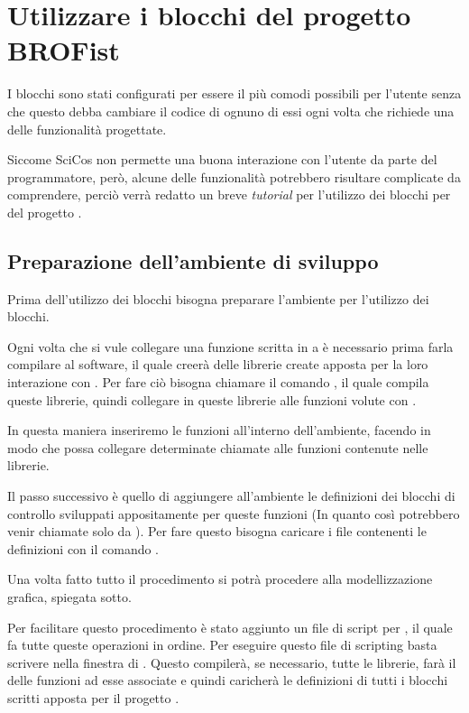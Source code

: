 \chapter{Utilizzare i blocchi del progetto BROFist}
I blocchi sono stati configurati per essere il più comodi possibili per
l'utente senza che questo debba cambiare il codice di ognuno di essi ogni
volta che richiede una delle funzionalità progettate.

Siccome SciCos non permette una buona interazione con l'utente da parte del
programmatore, però, alcune delle funzionalità potrebbero risultare
complicate da comprendere, perciò verrà redatto un breve \emph{tutorial}
per l'utilizzo dei blocchi per \SciCos{} del progetto \BROFist{}.

\section{Preparazione dell'ambiente di sviluppo}\label{sec:SciComp}
Prima dell'utilizzo dei blocchi bisogna preparare l'ambiente per l'utilizzo
dei blocchi.

Ogni volta che si vule collegare una funzione scritta in  a
\SciCosLab{} è necessario prima farla compilare al software, il quale
creerà delle librerie create apposta per la loro interazione con
\SciCosLab{}. Per fare ciò bisogna chiamare il comando
, il quale compila queste librerie, quindi
collegare in \SciCosLab{} queste librerie alle funzioni volute con
.

In questa maniera inseriremo le funzioni all'interno dell'ambiente, facendo
in modo che \SciCosLab{} possa collegare determinate chiamate alle funzioni
contenute nelle librerie.

Il passo successivo è quello di aggiungere all'ambiente le definizioni dei
blocchi di controllo sviluppati appositamente per queste funzioni (In
quanto così potrebbero venir chiamate solo da ). Per fare
questo bisogna caricare i file contenenti le definizioni con il comando
.

Una volta fatto tutto il procedimento si potrà procedere alla
modellizzazione grafica, spiegata sotto.

Per facilitare questo procedimento è stato aggiunto un file di script per
\SciCosLab{}, il quale fa tutte queste operazioni in ordine. Per eseguire
questo file di scripting basta scrivere nella finestra di 
. Questo compilerà, se necessario, tutte le
librerie, farà il  delle funzioni ad esse associate e
quindi caricherà le definizioni di tutti i blocchi scritti apposta per il
progetto \BROFist{}.

